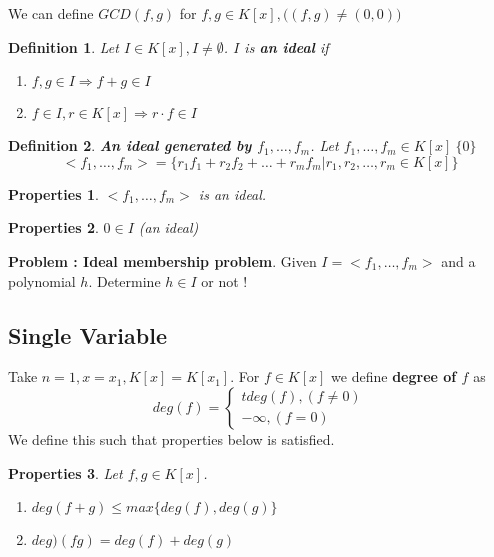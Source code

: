 \documentclass[a4paper,10pt]{article}
\newtheorem{prop}{Properties}
\newtheorem{defi}{Definition}
\begin{document}
We can define $ GCD(f,g) $ for $ f,g \in K[x] , \big( (f,g)\neq(0,0) \big)$ 

\begin{defi}
	Let $ I \in K[x] , I \neq \emptyset $. $ I $ is \textbf{an ideal} if
	\begin{enumerate}
		\item $ f,g \in I \Rightarrow f+g \in I $
		\item $ f \in I , r \in K[x] \Rightarrow r \cdot f \in I $
	\end{enumerate}
\end{defi}

\begin{defi}
	\textbf{An ideal generated by $ f_{1}, \dots, f_{m} $}. Let $ f_{1}, \dots, f_{m} \in K[x] \ \{0\}$
	\[ < f_{1}, \dots, f_{m} > = \{ r_{1}f_{1} + r_{2}f_{2} + \dots + r_{m}f_{m} | r_{1}, r_{2}, \dots, r_{m} \in K[x] \} \]
\end{defi}

\begin{prop}
	$ < f_{1}, \dots, f_{m} > $ is an ideal.
\end{prop} 

\begin{prop}
	$ 0 \in I $ (an ideal)
\end{prop}

\textbf{Problem : Ideal membership problem}. Given $ I=< f_{1}, \dots, f_{m} > $ and a polynomial $ h $. Determine $ h \in I $ or not ! 

\subsection{Single Variable}

Take $ n=1, x= x_{1}, K[x]=K[x_{1}] $. For $ f \in K[x] $ we define \textbf{degree of $ f $} as
\[ deg(f) = \begin{cases}
tdeg(f) , (f\neq0) \\ -\infty, (f=0)
\end{cases} \]
We define this such that properties below is satisfied.

\begin{prop}
	Let $ f,g \in K[x] $.
	\begin{enumerate}
		\item $ deg(f+g) \leq max \{ deg(f), deg(g) \} $
		\item $ deg)(fg) = deg(f)+deg(g) $
	\end{enumerate}
\end{prop}
\end{document}
